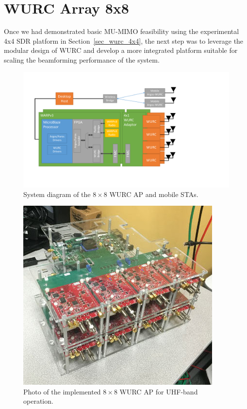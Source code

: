 \section{WURC Array 8x8}
\label{sec_wurc_8x8}

	Once we had demonstrated basic \ac{MU-MIMO} feasibility using the experimental 4x4 \ac{SDR} platform in Section~\ref{sec_wurc_4x4}, the next step was to leverage the modular design of \ac{WURC} and develop a more integrated platform suitable for scaling the beamforming performance of the system.
	
\begin{figure}[p] %
\centering
\includegraphics[width=1\linewidth]{./figs/argos-wurc_system_diagram}
\caption{System diagram of the $8\times8$ WURC \ac{AP} and mobile \acp{STA}.}
\label{fig:wurc_argos_hw}
\end{figure}


\begin{figure}[p] %
\centering
\includegraphics[width=0.7\linewidth]{./figs/MIMO_node.jpg}
\caption{Photo of the implemented $8\times8$ WURC \ac{AP} for UHF-band operation.}
\label{fig:mimohw}
\end{figure}

